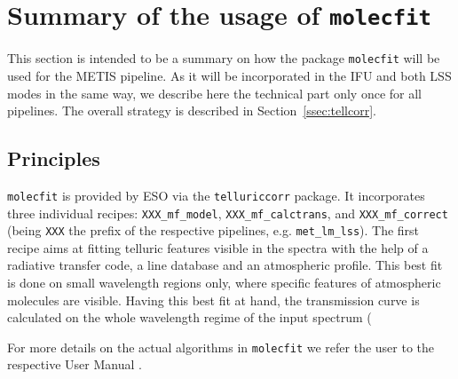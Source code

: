 \section{Summary of the usage of \texttt{molecfit}}\label{app:mf}
This section is intended to be a summary on how the package \texttt{molecfit} will be used for the \ac{METIS} pipeline. As it will be incorporated in the \ac{IFU} and both \ac{LSS} modes in the same way, we describe here the technical part only once for all pipelines. The overall strategy is described in Section~\ref{ssec:tellcorr}.
\subsection{Principles}\label{app:mf_principles}
\texttt{molecfit} is provided by \ac{ESO} via the \texttt{telluriccorr} package. It incorporates three individual recipes: \texttt{XXX_mf_model}, \texttt{XXX_mf_calctrans}, and \texttt{XXX_mf_correct} (being \texttt{XXX} the prefix of the respective pipelines, e.g. \texttt{met_lm_lss}). The first recipe aims at fitting telluric features visible in the spectra with the help of a radiative transfer code, a line database and an atmospheric profile. This best fit is done on small wavelength regions only, where specific features of atmospheric molecules are visible. Having this best fit at hand, the transmission curve is calculated on the whole wavelength regime of the input spectrum (

For more details on the actual algorithms in \texttt{molecfit} we refer the user to the respective User Manual \cite{molecfit}.\\

